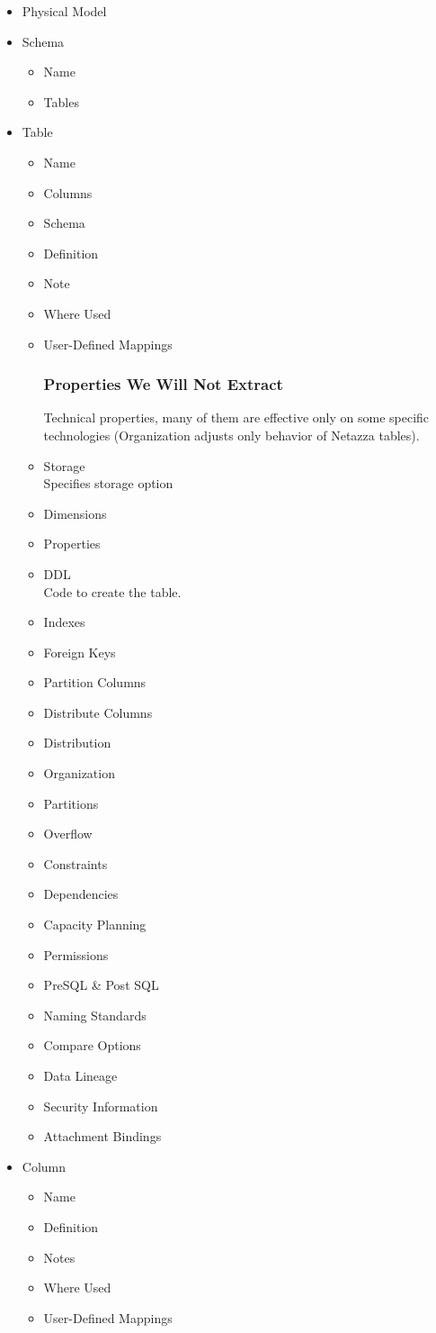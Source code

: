 \begin{itemize}
	\item Physical Model \\
	\item Schema
	 \begin{itemize}
	 	\item Name
	 	\item Tables
	 \end{itemize}
	\item Table
	\begin{itemize}
		\item Name
		\item Columns
		\item Schema
		\item Definition
		\item Note
		\item Where Used
		\item User-Defined Mappings
		\subsubsection{Properties We Will Not Extract}
		Technical properties, many of them are effective only on some specific technologies (Organization adjusts only behavior of Netazza tables). 
		\item Storage \\ 
		Specifies storage option
		\item Dimensions
		\item Properties
		\item DDL \\ 
		Code to create the table.
		\item Indexes
		\item Foreign Keys
		\item Partition Columns
		\item Distribute Columns
		\item Distribution
		\item Organization
		\item Partitions
		\item Overflow
		\item Constraints
		\item Dependencies
		\item Capacity Planning
		\item Permissions
		\item PreSQL \& Post SQL
		\item Naming Standards
		\item Compare Options
		\item Data Lineage
		\item Security Information
		\item Attachment Bindings
	\end{itemize}
	\item Column
	\begin{itemize}
		\item Name
		\item Definition
		\item Notes
		\item Where Used
		\item User-Defined Mappings

\end{itemize}
\end{itemize}
